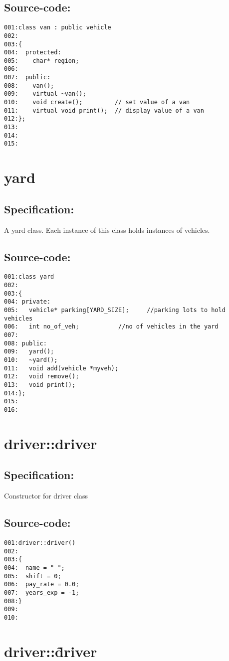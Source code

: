 \subsection*{Source-code:}
\begin{verbatim}
001:class van : public vehicle
002:
003:{
004:  protected:
005:    char* region;
006:
007:  public: 
008:    van();
009:    virtual ~van();
010:    void create();         // set value of a van
011:    virtual void print();  // display value of a van
012:};
013:
014:
015:
\end{verbatim}
\section{yard}
\subsection*{Specification:}
A yard class. Each instance of this class holds instances
   of vehicles.
\subsection*{Source-code:}
\begin{verbatim}
001:class yard
002:
003:{
004: private:
005:   vehicle* parking[YARD_SIZE];     //parking lots to hold vehicles
006:   int no_of_veh;           //no of vehicles in the yard
007:
008: public:
009:   yard();
010:   ~yard();
011:   void add(vehicle *myveh); 
012:   void remove(); 
013:   void print(); 
014:};
015:
016:
\end{verbatim}
\section{driver::driver}
\subsection*{Specification:}
Constructor for driver class
\subsection*{Source-code:}
\begin{verbatim}
001:driver::driver()
002:
003:{
004:  name = " ";
005:  shift = 0;
006:  pay_rate = 0.0;
007:  years_exp = -1;
008:}
009:
010:
\end{verbatim}
\section{driver::\~driver}
